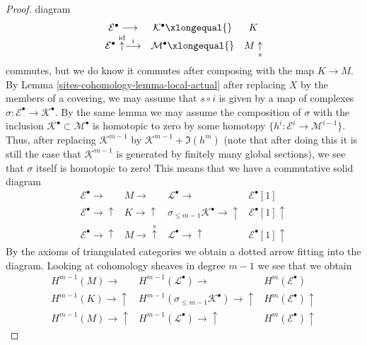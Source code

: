\begin{proof}
diagram
$$
\begin{array}{ccc}\mathcal{E}^\bullet \longrightarrow & \mathcal{K}^\bullet \xlongequal{} & K \\ \mathcal{E}^\bullet \overset{\text{id}}{\uparrow}\overset{i}{\longrightarrow} & \mathcal{M}^\bullet \xlongequal{} & M \underset{s}{\uparrow}\end{array}
$$
commutes, but we do know it commutes after composing with the
map $K \to M$. By Lemma \ref{sites-cohomology-lemma-local-actual} after replacing
$X$ by the members of a covering, we may
assume that $s \circ i$ is given by a map of complexes
$\sigma : \mathcal{E}^\bullet \to \mathcal{K}^\bullet$.
By the same lemma we may assume the composition of $\sigma$
with the inclusion $\mathcal{K}^\bullet \subset \mathcal{M}^\bullet$
is homotopic to zero by some homotopy
$\{h^i : \mathcal{E}^i \to \mathcal{M}^{i - 1}\}$.
Thus, after replacing $\mathcal{K}^{m - 1}$ by
$\mathcal{K}^{m - 1} + \Im(h^m)$ (note that after doing this
it is still the case that $\mathcal{K}^{m - 1}$ is generated
by finitely many global sections), we see that
$\sigma$ itself is homotopic to zero!
This means that we have a commutative solid diagram
$$
\begin{array}{cccc}\mathcal{E}^\bullet \longrightarrow & M \longrightarrow & \mathcal{L}^\bullet \longrightarrow & \mathcal{E}^\bullet[1] \\ \mathcal{E}^\bullet \longrightarrow\uparrow & K \longrightarrow\uparrow & \sigma_{\leq m - 1}\mathcal{K}^\bullet \longrightarrow\uparrow & \mathcal{E}^\bullet[1] \uparrow \\ \mathcal{E}^\bullet \longrightarrow\uparrow & M \longrightarrow\overset{s}{\uparrow} & \mathcal{L}^\bullet \longrightarrow\uparrow & \mathcal{E}^\bullet[1] \uparrow\end{array}
$$
By the axioms of triangulated categories we obtain a dotted
arrow fitting into the diagram.
Looking at cohomology sheaves in degree $m - 1$ we see that we obtain
$$
\begin{array}{ccc}H^{m - 1}(M) \longrightarrow & H^{m - 1}(\mathcal{L}^\bullet) \longrightarrow & H^m(\mathcal{E}^\bullet) \\ H^{m - 1}(K) \longrightarrow\uparrow & H^{m - 1}(\sigma_{\leq m - 1}\mathcal{K}^\bullet) \longrightarrow\uparrow & H^m(\mathcal{E}^\bullet) \uparrow \\ H^{m - 1}(M) \longrightarrow\uparrow & H^{m - 1}(\mathcal{L}^\bullet) \longrightarrow\uparrow & H^m(\mathcal{E}^\bullet) \uparrow\end{array}
$$
\end{proof}
